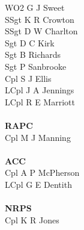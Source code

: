 \begin{multicols}{4}
  WO2 G J Sweet \\
  SSgt K R Crowton \\
  SSgt D W Charlton \\
  Sgt D C Kirk \\
  Sgt B Richards \\
  Sgt P Sanbrooke \\
  Cpl S J Ellis \\
  LCpl J A Jennings \\
  LCpl R E Marriott \\ \\
  \textbf{RAPC} \\
  Cpl M J Manning \\ \\
  \textbf{ACC} \\
  Cpl A P McPherson \\
  LCpl G E Dentith \\ \\
  \textbf{NRPS} \\
  Cpl K R Jones
\end{multicols}

\pagebreak
